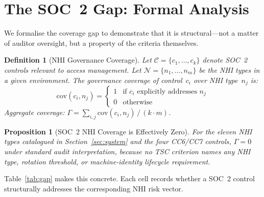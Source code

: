 \documentclass[journal]{IEEEtran}
\newtheorem{definition}{Definition}
\newtheorem{proposition}{Proposition}
\begin{document}
\section{The SOC~2 Gap: Formal Analysis}
\label{sec:gap}

We formalise the coverage gap to demonstrate that it is structural---not a matter of auditor oversight, but a property of the criteria themselves.

\begin{definition}[NHI Governance Coverage]
  Let $\mathcal{C} = \{c_1, \ldots, c_k\}$ denote SOC~2 controls relevant to access management. Let $\mathcal{N} = \{n_1, \ldots, n_m\}$ be the NHI types in a given environment. The governance coverage of control~$c_i$ over NHI type~$n_j$ is:
  \[
    \mathrm{cov}(c_i, n_j) =
    \begin{cases}
      1 & \text{if } c_i \text{ explicitly addresses } n_j \\
      0 & \text{otherwise}
    \end{cases}
  \]
  Aggregate coverage: $\Gamma = \sum_{i,j} \mathrm{cov}(c_i, n_j) \,/\, (k \cdot m)$.
\end{definition}

\begin{proposition}[SOC~2 NHI Coverage is Effectively Zero]
  For the eleven NHI types catalogued in Section~\ref{sec:system} and the four CC6/CC7 controls, $\Gamma = 0$ under standard audit interpretation, because no TSC criterion names any NHI type, rotation threshold, or machine-identity lifecycle requirement.
\end{proposition}

Table~\ref{tab:gap} makes this concrete. Each cell records whether a SOC~2 control structurally addresses the corresponding NHI risk vector.
\end{document}
